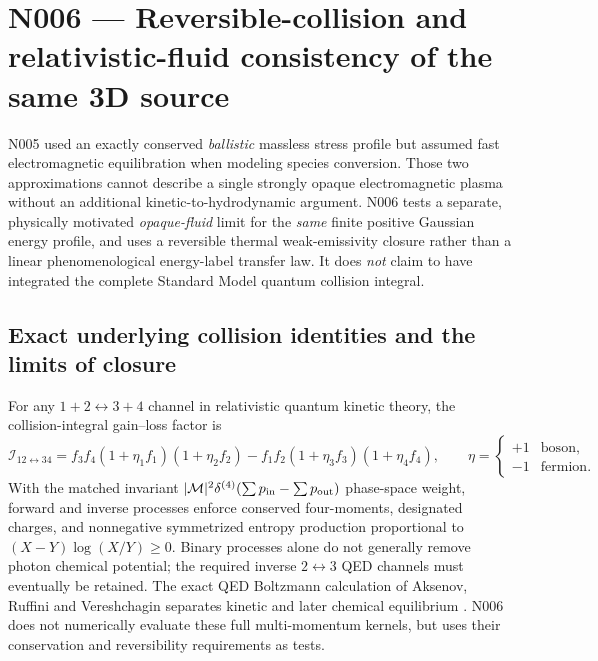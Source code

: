 \documentclass[11pt,a4paper]{article}
\theoremstyle{tmon}
\theoremstyle{definition}
\begin{document}
\section{N006 --- Reversible-collision and relativistic-fluid consistency of the same 3D source}\label{sec:n006}
N005 used an exactly conserved \emph{ballistic} massless stress profile but assumed fast electromagnetic equilibration when modeling species conversion. Those two approximations cannot describe a single strongly opaque electromagnetic plasma without an additional kinetic-to-hydrodynamic argument. N006 tests a separate, physically motivated \emph{opaque-fluid} limit for the \emph{same} finite positive Gaussian energy profile, and uses a reversible thermal weak-emissivity closure rather than a linear phenomenological energy-label transfer law. It does \emph{not} claim to have integrated the complete Standard Model quantum collision integral.

\subsection{Exact underlying collision identities and the limits of closure}
For any $1+2\leftrightarrow3+4$ channel in relativistic quantum kinetic theory, the collision-integral gain--loss factor is
\begin{equation}\label{eq:n006collision}
\mathscr I_{12\leftrightarrow34}=f_3f_4(1+\eta_1f_1)(1+\eta_2f_2)-f_1f_2(1+\eta_3f_3)(1+\eta_4f_4),\qquad \eta=\begin{cases}+1&\text{boson},\\-1&\text{fermion}.
\end{cases}
\end{equation}
With the matched invariant $|\mathcal M|^2\delta^{(4)}(\sum p_{\rm in}-\sum p_{\rm out})$ phase-space weight, forward and inverse processes enforce conserved four-moments, designated charges, and nonnegative symmetrized entropy production proportional to $(X-Y)\log(X/Y)\ge0$. Binary processes alone do not generally remove photon chemical potential; the required inverse $2\leftrightarrow3$ QED channels must eventually be retained. The exact QED Boltzmann calculation of Aksenov, Ruffini and Vereshchagin separates kinetic and later chemical equilibrium \cite{N005Pair,N006UU}. N006 does not numerically evaluate these full multi-momentum kernels, but uses their conservation and reversibility requirements as tests.
\end{document}
